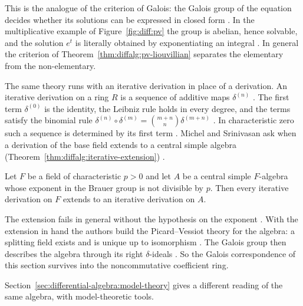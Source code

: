 This is the analogue of the criterion of Galois: the Galois group of the
equation decides whether its solutions can be expressed in closed form
\cite[pp.~5--6]{Kolchin1948PicardVessiot}. In the multiplicative example
of Figure~\ref{fig:diff:pv} the group is abelian, hence solvable, and the
solution $e^t$ is literally obtained by exponentiating an integral
\cite[pp.~249--250]{HubbardLundell2011}. In general the criterion of
Theorem~\ref{thm:diffalg:pv-liouvillian} separates the elementary from
the non-elementary.

The same theory runs with an iterative derivation in place of a derivation.
An iterative derivation on a ring $R$ is a sequence of additive maps
$\delta^{(n)}$ \cite[p.~1]{MichelSrinivasan2026}. The first term
$\delta^{(0)}$ is the identity, the Leibniz rule holds in every degree, and
the terms satisfy the binomial rule
$\delta^{(n)}\circ\delta^{(m)}=\binom{m+n}{n}\delta^{(m+n)}$
\cite[p.~1]{MichelSrinivasan2026}. In characteristic zero such a sequence is
determined by its first term \cite[p.~2]{MichelSrinivasan2026}. Michel and
Srinivasan ask when a derivation of the base field extends to a central
simple algebra (Theorem~\ref{thm:diffalg:iterative-extension}) \cite[p.~1]{MichelSrinivasan2026}.

\begin{theorem}\label{thm:diffalg:iterative-extension}
Let $F$ be a field of characteristic $p>0$ and let $A$ be a central simple
$F$-algebra whose exponent in the Brauer group is not divisible by $p$.
Then every iterative derivation on $F$ extends to an iterative derivation
on $A$.
\end{theorem}

The extension fails in general without the hypothesis on the exponent
\cite[p.~2]{MichelSrinivasan2026}. With the extension in hand the authors
build the Picard--Vessiot theory for the algebra: a splitting field exists
and is unique up to isomorphism \cite[p.~1]{MichelSrinivasan2026}. The
Galois group then describes the algebra through its right $\delta$-ideals
\cite[p.~1]{MichelSrinivasan2026}. So the Galois correspondence of this
section survives into the noncommutative coefficient ring.

Section~\ref{sec:differential-algebra:model-theory}
gives a different reading of the same algebra, with model-theoretic
tools.


